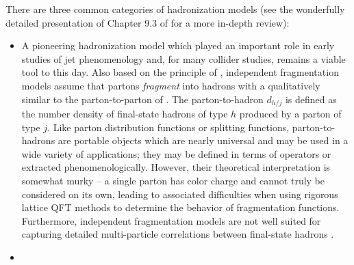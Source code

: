\begin{subappendices}
There are three common categories of hadronization models (see the wonderfully detailed presentation of Chapter 9.3 of  for a more in-depth review):
\begin{itemize}
    \item

        A pioneering hadronization model which played an important role in early studies of jet phenomenology and, for many collider studies, remains a viable tool to this day.
        Also based on the principle of , independent fragmentation models assume that partons \textit{fragment} into hadrons with a  qualitatively similar to the \gls{parton-to-parton} of  \cite{Collins:2023cuo,Collins:2011zzd}.
        The \gls{parton-to-hadron} \(d_{h/j}\) is defined as the number density of final-state hadrons of type \(h\) produced by a parton of type \(j\).
        Like parton distribution functions or splitting functions, \glspl{parton-to-hadron} are portable objects which are nearly universal and may be used in a wide variety of applications;
        they may be defined in terms of operators or extracted phenomenologically.
        However, their theoretical interpretation is somewhat murky -- a single parton has color charge and cannot truly be considered on its own, leading to associated difficulties when using rigorous lattice QFT methods to determine the behavior of fragmentation functions.
        Furthermore, independent fragmentation models are not well suited for capturing detailed multi-particle correlations between final-state hadrons \cite{JADE:1983mvo}.


    \item


\end{itemize}
\end{subappendices}
